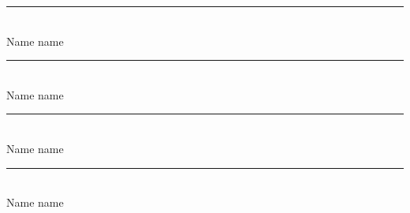 \newpage
\parbox{10px}{}
\vfill


\begin{flushright}
	\rule[-0.1cm]{7cm}{0.01cm}\\
	Name name\\
\end{flushright}

\begin{flushright}
	\rule[-0.1cm]{7cm}{0.01cm}\\
	Name name\\
\end{flushright}

\begin{flushright}
	\rule[-0.1cm]{7cm}{0.01cm}\\
	Name name\\
\end{flushright}

\begin{flushright}
	\rule[-0.1cm]{7cm}{0.01cm}\\
	Name name\\
\end{flushright}
